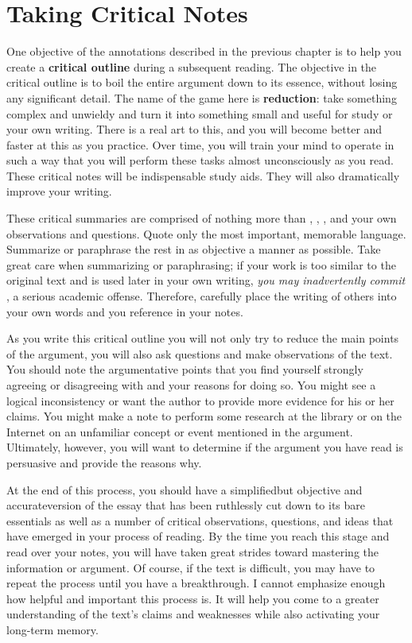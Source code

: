 \section{Taking Critical Notes}

One objective of the annotations described in the previous chapter is to help you create a \textbf{critical outline} during a subsequent reading. The objective in the critical
outline is to boil the entire argument down to its essence, without losing any
significant detail. The name of the game here is \textbf{reduction}: take
something complex and unwieldy and turn it into something small and useful for
study or your own writing. There is a real art to this, and you will become
better and faster at this as you practice. Over time, you will train your mind
to operate in such a way that you will perform these tasks almost unconsciously
as you read. These critical notes will be indispensable study aids. They will
also dramatically improve your writing.

These critical summaries are comprised of nothing more than \hyperlink{summary}{\color{Ahrenge}{summary}}, \hyperlink{paraphrase}{\color{Ahrenge}{paraphrase}}, \hyperlink{quotation}{\color{Ahrenge}{quotation}}, and your own observations and
questions. Quote only the most important, memorable language. Summarize or
paraphrase the rest in as objective a manner as possible. Take great care when
summarizing or paraphrasing; if your work is too similar to the original text
and is used later in your own writing, \emph{you may inadvertently commit
\hyperlink{plagiarism}{\color{Ahrenge}{plagiarism}}}, a serious academic
offense. Therefore, carefully place the writing of others into your own words
and \hyperlink{citation}{\color{Ahrenge}{cite the page numbers}} you reference in your notes.

As you write this critical outline you will not only try to reduce the main
points of the argument, you will also ask questions and make observations of the
text. You should note the argumentative points that you find yourself strongly
agreeing or disagreeing with and your reasons for doing so. You might see a
logical inconsistency or want the author to provide more evidence for his or her
claims. You might make a note to perform some research at the library or on the
Internet on an unfamiliar concept or event mentioned in the argument.
Ultimately, however, you will want to determine if the argument you have read is
persuasive and provide the reasons why.

At the end of this process, you should have a simplified\textemdash but
objective and accurate\textemdash version of the essay that has been ruthlessly
cut down to its bare essentials as well as a number of critical observations,
questions, and ideas that have emerged in your process of reading. By the time
you reach this stage and read over your notes, you will have taken great strides
toward mastering the information or argument. Of course, if the text is difficult, you may have to repeat the process until you have a breakthrough. I cannot emphasize enough how helpful and important this process is. It will help you come to a greater understanding of the text’s claims and weaknesses while also activating your long-term memory. 

